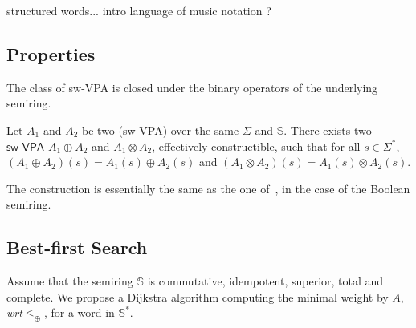 \documentclass[runningheads]{llncs}
\def\wrt{\textit{wrt}\xspace}
\newcommand{\Semiring}{\mathbb{S}}
\def\SWVPA{\textsf{sw-VPA}\xspace}
\begin{document}
\begin{example}
structured words...
intro language of music notation ?
\end{example}


\subsection{Properties}
The class of \SWVPA is closed under the binary operators of the underlying semiring.
%
\begin{proposition}
Let $A_1$ and $A_2$ be two (\SWVPA)
over the same $\Sigma$ and $\Semiring$.
There exists two $\SWVPA$ $A_1 \oplus A_2$ and $A_1 \otimes A_2$, 
effectively constructible, 
such that for all $s \in \Sigma^*$, 
$(A_1 \oplus A_2)(s) = A_1(s) \oplus A_2(s)$ and 
$(A_1 \otimes A_2)(s) = A_1(s) \otimes A_2(s)$.
\end{proposition}
The construction is essentially the same 
as the one of~\cite{dAntonyAlur14SVPDA}, in the case of the Boolean semiring.


\subsection{Best-first Search}
Assume that the semiring $\Semiring$ is 
commutative, idempotent, superior, total and complete.
We propose a Dijkstra algorithm computing the minimal weight by $A$, 
\wrt $\leq_\oplus$, for a word in $\Semiring^*$.
\end{document}
